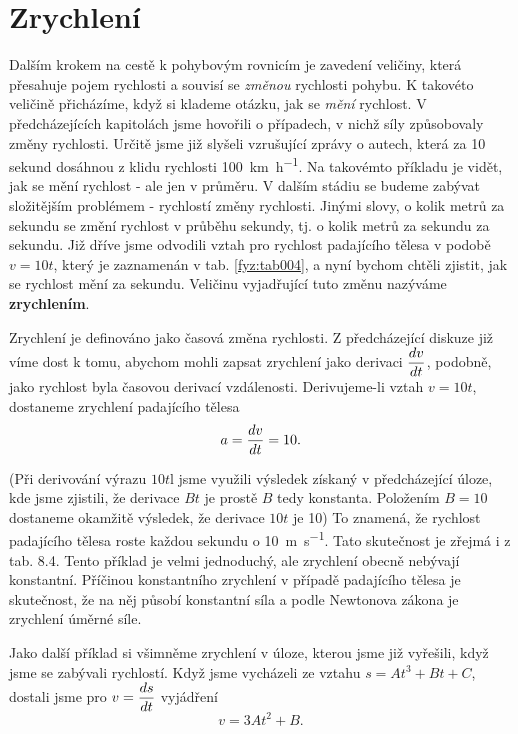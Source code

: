   \section{Zrychlení}
    Dalším krokem na cestě k pohybovým rovnicím je zavedení veličiny, která přesahuje pojem 
    rychlosti a souvisí se \emph{změnou} rychlosti pohybu. K takovéto veličině přicházíme, když si 
    klademe otázku, jak se \emph{mění} rychlost. V předcházejících kapitolách jsme hovořili o 
    případech, v nichž síly způsobovaly změny rychlosti. Určitě jsme již slyšeli vzrušující zprávy 
    o autech, která za \num{10} sekund dosáhnou z klidu rychlosti \SI{100}{km\per\hour}. Na 
    takovémto příkladu je vidět, jak se mění rychlost - ale jen v průměru. V dalším stádiu se 
    budeme zabývat složitějším problémem - rychlostí změny rychlosti. Jinými slovy, o kolik metrů 
    za sekundu se změní rychlost v průběhu sekundy, tj. o kolik metrů za sekundu za sekundu. Již 
    dříve jsme odvodili vztah pro rychlost padajícího tělesa v podobě \(v= 10 t\), který je 
    zaznamenán v tab. \ref{fyz:tab004}, a nyní bychom chtěli zjistit, jak se rychlost mění za 
    sekundu. Veličinu vyjadřující tuto změnu nazýváme \textbf{zrychlením}.
    
    Zrychlení je definováno jako časová změna rychlosti. Z předcházející diskuze již víme dost k 
    tomu, abychom mohli zapsat zrychlení jako derivaci \(\dfrac{d v}{d t}\), podobně, jako rychlost byla 
    časovou derivací vzdálenosti. Derivujeme-li vztah \(v= 10t\), dostaneme zrychlení padajícího 
    tělesa
    \begin{equation}\label{fyz:eq101}
      a = \dfrac{d v}{d t} = 10.
    \end{equation}
    
    (Při derivování výrazu \(10t\)l jsme využili výsledek získaný v předcházející úloze, kde jsme 
    zjistili, že derivace \(Bt\) je prostě \(B\) tedy konstanta. Položením \(B=10\) dostaneme 
    okamžitě výsledek, že derivace \(10t\) je \num{10}) To znamená, že rychlost padajícího tělesa 
    roste každou sekundu o \SI{10}{\m\per\s}. Tato skutečnost je zřejmá i z tab. 8.4. Tento příklad 
    je velmi jednoduchý, ale zrychlení obecně nebývají konstantní. Příčinou konstantního zrychlení 
    v případě padajícího tělesa je skutečnost, že na něj působí konstantní síla a podle Newtonova 
    zákona je zrychlení úměrné síle.
    
    Jako další příklad si všimněme zrychlení v úloze, kterou jsme již vyřešili, když jsme se 
    zabývali rychlostí. Když jsme vycházeli ze vztahu \(s = At^3 + Bt + C\), dostali jsme pro 
    \(v=\dfrac{d s}{d t}\) vyjádření
    \begin{equation}\label{fyz:eq102}
      v = 3At^2 + B.
    \end{equation}
    
